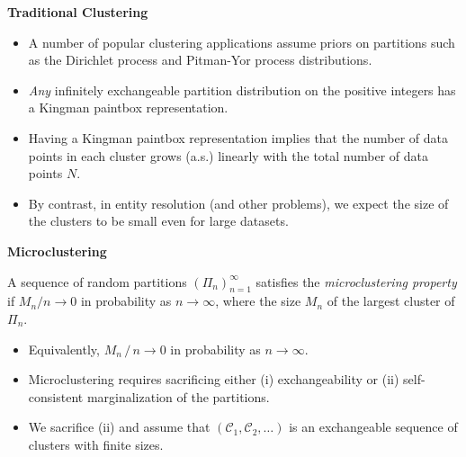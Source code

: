 \documentclass[portrait,a0b,final]{a0poster}
\newcommand{\sC}{\mathcal{C}}
\newenvironment{poster}{
  \begin{center}
  \begin{minipage}[c]{0.98\textwidth}
}{
  \end{minipage}
  \end{center}
}
\newcommand{\pbox}[4]{
\psshadowbox[#3]{
\begin{minipage}[t][#2][t]{#1}
#4
\end{minipage}
}}
\begin{document}
\begin{poster}
\begin{multicols}{3}
  



\vspace*{1em}

\begin{center}\pbox{0.8\columnwidth}{}{linewidth=2mm,framearc=0.1,linecolor=lightblue,fillstyle=gradient,gradangle=0,
gradbegin=white,gradend=whiteblue,gradmidpoint=1.0,framesep=1em}{\begin{center}{\large \bf Microclustering property }\end{center}}\end{center}
\vspace{.75cm}



\begin{center}
\textbf{Traditional Clustering}
\end{center}


\begin{itemize}
\item A number of popular clustering applications assume priors on partitions such as the Dirichlet process and Pitman-Yor process distributions.
\item \emph{Any} infinitely exchangeable partition distribution on the positive integers has a Kingman paintbox representation.
\item Having a Kingman paintbox representation implies that the number of data points in each cluster grows (a.s.) linearly with the total number of data points $N$.
\item By contrast, in entity resolution (and other problems), we expect the size of the clusters to be small even for large datasets.
\end{itemize}

\vspace*{1em}

\begin{center}
\textbf{Microclustering}
\end{center}
A sequence of random partitions $(\Pi_n)_{n=1}^\infty$ satisfies the \emph{microclustering property} if $M_n/n\to0$ in probability as $n\to\infty$, where the size $M_n$ of the largest cluster of $\Pi_n$.

\begin{itemize}
\item Equivalently, $M_n \,/\, n \rightarrow 0$ in probability as $n \rightarrow \infty$.
\item Microclustering requires sacrificing either (i) exchangeability or (ii) self-consistent marginalization of the partitions. 
\item We sacrifice (ii) and assume that $(\sC_1,\sC_2,\dots)$ is an exchangeable sequence of clusters with finite sizes.
\end{itemize}



\end{multicols}
\end{poster}
\end{document}
